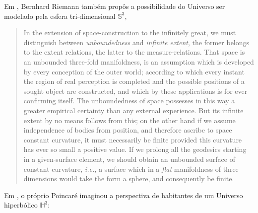 Em , Bernhard Riemann também propôs a possibilidade do Universo ser modelado pela esfera tri-dimensional $\mathbb{S}^3$, 
\blockquote{
In the extension of space-construction to the infinitely great, we must distinguish between \emph{unboundedness} and \emph{infinite extent}, the former belongs to the extent relations, the latter to the measure-relations. That space is an unbounded three-fold manifoldness, is an assumption which is developed by every conception of the outer world; according to which every instant the region of real perception is completed and the possible positions of a sought object are constructed, and which by these applications is for ever confirming itself. The unboundedness of space possesses in this way a greater empirical certainty than any external experience. But its infinite extent by no means follows from this; on the other hand if we assume independence of bodies from position, and therefore ascribe to space constant curvature, it must necessarily be finite provided this curvature has ever so small a positive value. If we prolong all the geodesics starting in a given-surface element, we should obtain an unbounded surface of constant curvature, \emph{i.e.,} a surface which in a \emph{flat} manifoldness of three dimensions would take the form a sphere, and consequently be finite.
}
Em , o próprio Poincaré imaginou a perspectiva de habitantes de um Universo hiperbólico $\mathbb{H}^3$:

